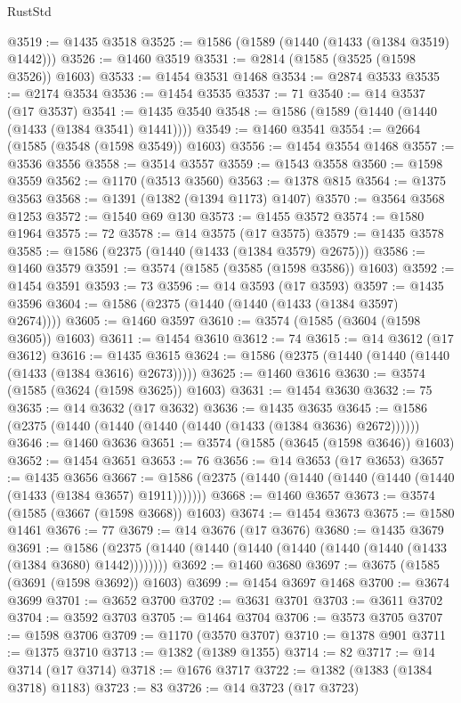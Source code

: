 \begin{lexlean}{RustStd}
\begin{coremodule}
@3519 := @1435 @3518
@3525 := @1586 (@1589 (@1440 (@1433 (@1384 @3519) @1442)))
@3526 := @1460 @3519
@3531 := @2814 (@1585 (@3525 (@1598 @3526)) @1603)
@3533 := @1454 @3531 @1468
@3534 := @2874 @3533
@3535 := @2174 @3534
@3536 := @1454 @3535
@3537 := 71
@3540 := @14 @3537 (@17 @3537)
@3541 := @1435 @3540
@3548 := @1586 (@1589 (@1440 (@1440 (@1433 (@1384 @3541) @1441))))
@3549 := @1460 @3541
@3554 := @2664 (@1585 (@3548 (@1598 @3549)) @1603)
@3556 := @1454 @3554 @1468
@3557 := @3536 @3556
@3558 := @3514 @3557
@3559 := @1543 @3558
@3560 := @1598 @3559
@3562 := @1170 (@3513 @3560)
@3563 := @1378 @815
@3564 := @1375 @3563
@3568 := @1391 (@1382 (@1394 @1173) @1407)
@3570 := @3564 @3568 @1253
@3572 := @1540 @69 @130
@3573 := @1455 @3572
@3574 := @1580 @1964
@3575 := 72
@3578 := @14 @3575 (@17 @3575)
@3579 := @1435 @3578
@3585 := @1586 (@2375 (@1440 (@1433 (@1384 @3579) @2675)))
@3586 := @1460 @3579
@3591 := @3574 (@1585 (@3585 (@1598 @3586)) @1603)
@3592 := @1454 @3591
@3593 := 73
@3596 := @14 @3593 (@17 @3593)
@3597 := @1435 @3596
@3604 := @1586 (@2375 (@1440 (@1440 (@1433 (@1384 @3597) @2674))))
@3605 := @1460 @3597
@3610 := @3574 (@1585 (@3604 (@1598 @3605)) @1603)
@3611 := @1454 @3610
@3612 := 74
@3615 := @14 @3612 (@17 @3612)
@3616 := @1435 @3615
@3624 := @1586 (@2375 (@1440 (@1440 (@1440 (@1433 (@1384 @3616) @2673)))))
@3625 := @1460 @3616
@3630 := @3574 (@1585 (@3624 (@1598 @3625)) @1603)
@3631 := @1454 @3630
@3632 := 75
@3635 := @14 @3632 (@17 @3632)
@3636 := @1435 @3635
@3645 := @1586 (@2375 (@1440 (@1440 (@1440 (@1440 (@1433 (@1384 @3636) @2672))))))
@3646 := @1460 @3636
@3651 := @3574 (@1585 (@3645 (@1598 @3646)) @1603)
@3652 := @1454 @3651
@3653 := 76
@3656 := @14 @3653 (@17 @3653)
@3657 := @1435 @3656
@3667 := @1586 (@2375 (@1440 (@1440 (@1440 (@1440 (@1440 (@1433 (@1384 @3657) @1911)))))))
@3668 := @1460 @3657
@3673 := @3574 (@1585 (@3667 (@1598 @3668)) @1603)
@3674 := @1454 @3673
@3675 := @1580 @1461
@3676 := 77
@3679 := @14 @3676 (@17 @3676)
@3680 := @1435 @3679
@3691 := @1586 (@2375 (@1440 (@1440 (@1440 (@1440 (@1440 (@1440 (@1433 (@1384 @3680) @1442))))))))
@3692 := @1460 @3680
@3697 := @3675 (@1585 (@3691 (@1598 @3692)) @1603)
@3699 := @1454 @3697 @1468
@3700 := @3674 @3699
@3701 := @3652 @3700
@3702 := @3631 @3701
@3703 := @3611 @3702
@3704 := @3592 @3703
@3705 := @1464 @3704
@3706 := @3573 @3705
@3707 := @1598 @3706
@3709 := @1170 (@3570 @3707)
@3710 := @1378 @901
@3711 := @1375 @3710
@3713 := @1382 (@1389 @1355)
@3714 := 82
@3717 := @14 @3714 (@17 @3714)
@3718 := @1676 @3717
@3722 := @1382 (@1383 (@1384 @3718) @1183)
@3723 := 83
@3726 := @14 @3723 (@17 @3723)

\end{coremodule}
\end{lexlean}
